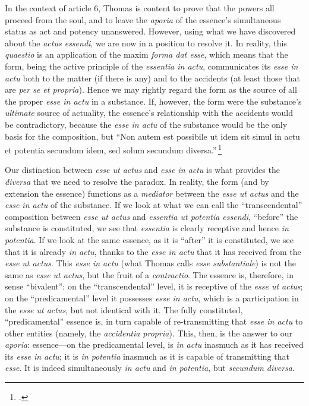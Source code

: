 In the context of article 6, Thomas is content to prove that the powers all proceed from the soul, and to leave the \emph{aporia} of the essence’s simultaneous status as act and potency unanswered. However, using what we have discovered about the \emph{actus essendi}, we are now in a position to resolve it. In reality, this \emph{quaestio} is an application of the maxim \emph{forma dat esse}, which means that the form, being the active principle of the \emph{essentia in actu}, communicates its \emph{esse in actu} both to the matter (if there is any) and to the accidents (at least those that are \emph{per se et propria}). Hence we may rightly regard the form as the source of all the proper \emph{esse in actu} in a substance. If, however, the form were the substance’s \emph{ultimate} source of actuality, the essence’s relationship with the accidents would be contradictory, because the \emph{esse in actu} of the substance would be the only basis for the composition, but “Non autem est possibile ut idem sit simul in actu et potentia secundum idem, sed solum secundum diversa.”\,\footcite[I, q.~2, a.~3, co.]{st:summa}

Our distinction between \emph{esse ut actus} and \emph{esse in actu} is what provides the \emph{diversa} that we need to resolve the paradox. In reality, the form (and by extension the essence) functions as a \emph{mediator} between the \emph{esse ut actus} and the \emph{esse in actu} of the substance. If we look at what we can call the “transcendental” composition between \emph{esse ut actus} and \emph{essentia ut potentia essendi}, “before” the substance is constituted, we see that \emph{essentia} is clearly receptive and hence \emph{in potentia}. If we look at the same essence, as it is “after” it is constituted, we see that it is already \emph{in actu}, thanks to the \emph{esse in actu} that it has received from the \emph{esse ut actus}. This \emph{esse in actu} (what Thomas calls \emph{esse substantiale}) is not the same as \emph{esse ut actus}, but the fruit of a \emph{contractio}. The essence is, therefore, in sense “bivalent”: on the “transcendental” level, it is receptive of the \emph{esse ut actus}; on the “predicamental” level it possesses \emph{esse in actu}, which is a participation in the \emph{esse ut actus}, but not identical with it. The fully constituted, “predicamental” essence is, in turn capable of re-transmitting that \emph{esse in actu} to other entities (namely, the \emph{accidentia propria}). This, then, is the answer to our \emph{aporia}: essence—on the predicamental level, is \emph{in actu} inasmuch as it has received its \emph{esse in actu}; it is \emph{in potentia} inasmuch as it is capable of transmitting that \emph{esse}. It is indeed simultaneously \emph{in actu} and \emph{in potentia}, but \emph{secundum diversa}.

